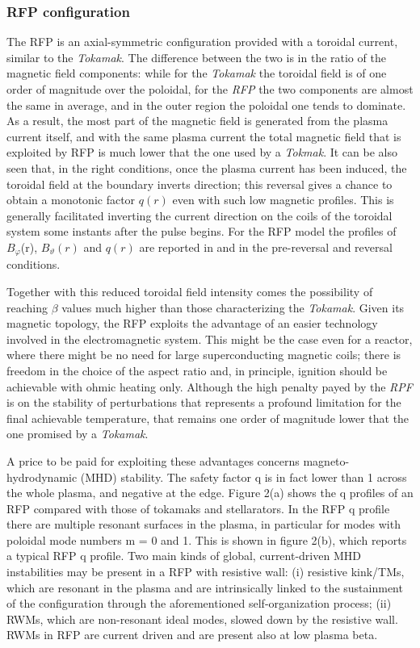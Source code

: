 \subsubsection{RFP configuration}
The \ac{RFP} is an axial-symmetric configuration provided with a toroidal current, similar to the \textit{Tokamak}. The difference between the two is in the ratio of the magnetic field components: while for the \textit{Tokamak} the toroidal field is of one order of magnitude over the poloidal, for the \textit{RFP} the two components are almost the same in average, and in the outer region the poloidal one tends to dominate. As a result, the most part of the magnetic field is generated from the plasma current itself, and with the same plasma current the total magnetic field that is exploited by \acs{RFP} is much lower that the one used by a \textit{Tokmak}. It can be also seen that, in the right conditions, once the plasma current has been induced, the toroidal field at the boundary inverts direction; this reversal gives a chance to obtain a monotonic factor $q(r)$ even with such low magnetic profiles. This is generally facilitated inverting the current direction on the coils of the toroidal system some instants after the pulse begins. For the \acs{RFP} model the profiles of $B_\varphi$(r), $B_\vartheta(r)$ and $q(r)$ are reported in \Figure{\ref{fig:intro_safety_factor_profiles_b}} and \Figure{\ref{fig:intro_safety_factor_profiles_c}} in the pre-reversal and reversal conditions.

Together with this reduced toroidal field intensity comes the possibility of reaching $\beta$ values much higher than those characterizing the \textit{Tokamak}. 
Given its magnetic topology, the RFP exploits the advantage of an easier technology involved in the electromagnetic system. This might be the case even for a reactor, where there might be no need for large superconducting magnetic coils; there is freedom in the choice of the aspect ratio and, in principle, ignition should be achievable with ohmic heating only.  
Although the high penalty payed by the \textit{RPF} is on the stability of perturbations that represents a profound limitation for the final achievable temperature, that remains one order of magnitude lower that the one promised by a \textit{Tokamak}.

A price to be paid for exploiting these advantages concerns magneto-hydrodynamic (MHD) stability. The safety factor q is in fact lower than 1 across the whole plasma, and negative at the edge. Figure 2(a) shows the q profiles of an RFP compared with those of tokamaks and stellarators. In the RFP q profile there are multiple resonant surfaces in the plasma, in particular for modes with poloidal mode numbers m = 0 and 1. This is shown in figure 2(b), which reports a typical RFP q profile. Two main kinds of global, current-driven MHD instabilities may be present in a RFP with resistive wall: (i) resistive kink/TMs, which are resonant in the plasma and are intrinsically linked to the sustainment of the configuration through the aforementioned self-organization process; (ii) RWMs, which are non-resonant ideal modes, slowed down by the resistive wall. RWMs in RFP are current driven and are present also at low plasma beta.


